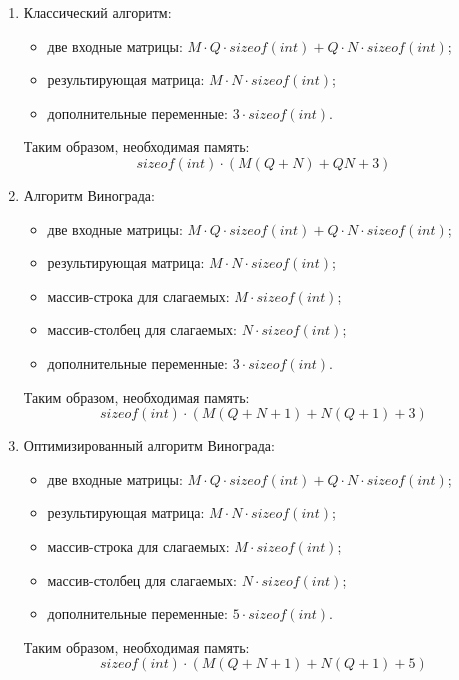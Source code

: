 \begin{enumerate}
	\item Классический алгоритм:
	\begin{itemize}[label=---]
		\item две входные матрицы: $M\cdot Q \cdot sizeof(int) + Q\cdot N \cdot sizeof(int)$;
		\item результирующая матрица: $M\cdot N\cdot sizeof(int)$;
		\item дополнительные переменные: $3\cdot sizeof(int)$.
	\end{itemize}
	
	Таким образом, необходимая память:
	\begin{equation}
		\label{memclassic}
		sizeof(int)\cdot(M(Q+N)+QN+3)
	\end{equation}
	
	\item Алгоритм Винограда:
	\begin{itemize}[label=---]
		\item две входные матрицы: $M\cdot Q \cdot sizeof(int) + Q\cdot N \cdot sizeof(int)$;
		\item результирующая матрица: $M\cdot N\cdot sizeof(int)$;
		\item массив-строка для слагаемых: $M\cdot sizeof(int)$;
		\item массив-столбец для слагаемых: $N\cdot sizeof(int)$;
		\item дополнительные переменные: $3\cdot sizeof(int)$.
	\end{itemize}
	
	Таким образом, необходимая память:
	\begin{equation}
		\label{mem}
		sizeof(int)\cdot(M(Q+N+1) + N(Q+1) + 3)
	\end{equation}
	
	\item Оптимизированный алгоритм Винограда:
	\begin{itemize}[label=---]
		\item две входные матрицы: $M\cdot Q \cdot sizeof(int) + Q\cdot N \cdot sizeof(int)$;
		\item результирующая матрица: $M\cdot N\cdot sizeof(int)$;
		\item массив-строка для слагаемых: $M\cdot sizeof(int)$;
		\item массив-столбец для слагаемых: $N\cdot sizeof(int)$;
		\item дополнительные переменные: $5\cdot sizeof(int)$.
	\end{itemize}
	
	Таким образом, необходимая память:
	\begin{equation}
		\label{memopt}
		sizeof(int)\cdot(M(Q+N+1) + N(Q+1) + 5)
	\end{equation}
\end{enumerate}

